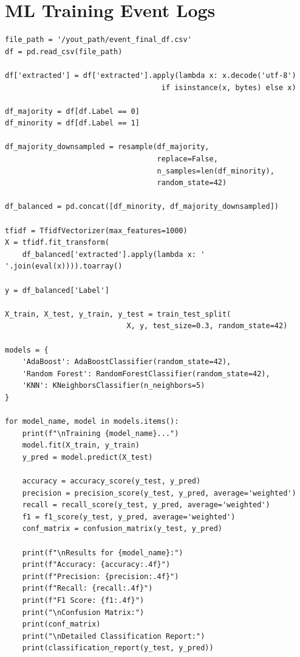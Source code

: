 \documentclass[Master,BMR,english]{twbook}
\begin{document}
\section{ML Training Event Logs}
\begin{listing}[htbp]
\begin{verbatim}
file_path = '/yout_path/event_final_df.csv'
df = pd.read_csv(file_path)

df['extracted'] = df['extracted'].apply(lambda x: x.decode('utf-8') 
                                    if isinstance(x, bytes) else x)

df_majority = df[df.Label == 0]
df_minority = df[df.Label == 1]

df_majority_downsampled = resample(df_majority,
                                   replace=False,
                                   n_samples=len(df_minority),
                                   random_state=42)

df_balanced = pd.concat([df_minority, df_majority_downsampled])

tfidf = TfidfVectorizer(max_features=1000)
X = tfidf.fit_transform(
    df_balanced['extracted'].apply(lambda x: ' '.join(eval(x)))).toarray()

y = df_balanced['Label']

X_train, X_test, y_train, y_test = train_test_split(
                            X, y, test_size=0.3, random_state=42)

models = {
    'AdaBoost': AdaBoostClassifier(random_state=42),
    'Random Forest': RandomForestClassifier(random_state=42),
    'KNN': KNeighborsClassifier(n_neighbors=5)
}

for model_name, model in models.items():
    print(f"\nTraining {model_name}...")
    model.fit(X_train, y_train)
    y_pred = model.predict(X_test)

    accuracy = accuracy_score(y_test, y_pred)
    precision = precision_score(y_test, y_pred, average='weighted')
    recall = recall_score(y_test, y_pred, average='weighted')
    f1 = f1_score(y_test, y_pred, average='weighted')
    conf_matrix = confusion_matrix(y_test, y_pred)

    print(f"\nResults for {model_name}:")
    print(f"Accuracy: {accuracy:.4f}")
    print(f"Precision: {precision:.4f}")
    print(f"Recall: {recall:.4f}")
    print(f"F1 Score: {f1:.4f}")
    print("\nConfusion Matrix:")
    print(conf_matrix)
    print("\nDetailed Classification Report:")
    print(classification_report(y_test, y_pred))
\end{verbatim}
\caption{ML Training Event Logs}
\end{listing}
\end{document}
